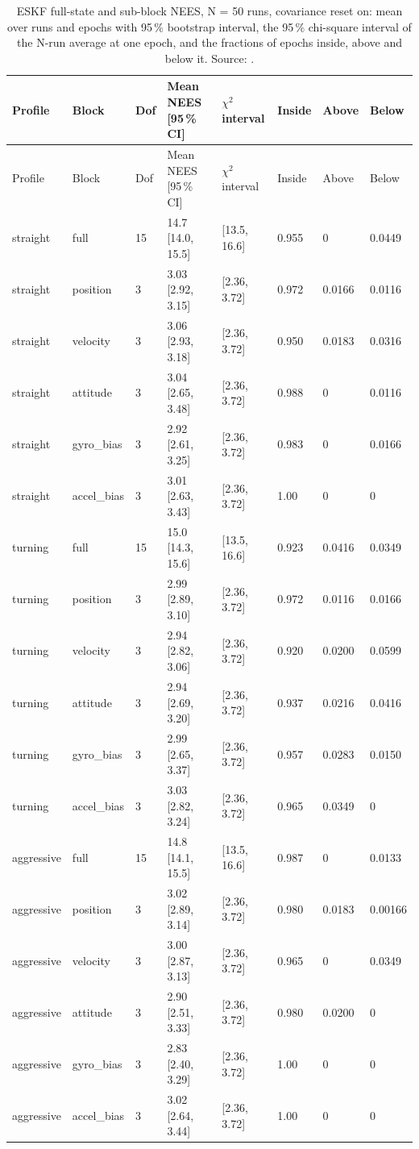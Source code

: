 {\small
\begin{longtable}{llllllll}
\caption{ESKF full-state and sub-block NEES, N = 50 runs, covariance reset on: mean over runs and epochs with 95\,\% bootstrap interval, the 95\,\% chi-square interval of the N-run average at one epoch, and the fractions of epochs inside, above and below it. Source: .}\label{tab:es_consistency}\\
\toprule
Profile & Block & Dof & Mean NEES [95\,\% CI] & $\chi^2$ interval & Inside & Above & Below \\
\midrule
\endfirsthead
\toprule
Profile & Block & Dof & Mean NEES [95\,\% CI] & $\chi^2$ interval & Inside & Above & Below \\
\midrule
\endhead
straight & full & 15 & 14.7 [14.0, 15.5] & [13.5, 16.6] & 0.955 & 0 & 0.0449 \\
straight & position & 3 & 3.03 [2.92, 3.15] & [2.36, 3.72] & 0.972 & 0.0166 & 0.0116 \\
straight & velocity & 3 & 3.06 [2.93, 3.18] & [2.36, 3.72] & 0.950 & 0.0183 & 0.0316 \\
straight & attitude & 3 & 3.04 [2.65, 3.48] & [2.36, 3.72] & 0.988 & 0 & 0.0116 \\
straight & gyro\_bias & 3 & 2.92 [2.61, 3.25] & [2.36, 3.72] & 0.983 & 0 & 0.0166 \\
straight & accel\_bias & 3 & 3.01 [2.63, 3.43] & [2.36, 3.72] & 1.00 & 0 & 0 \\
turning & full & 15 & 15.0 [14.3, 15.6] & [13.5, 16.6] & 0.923 & 0.0416 & 0.0349 \\
turning & position & 3 & 2.99 [2.89, 3.10] & [2.36, 3.72] & 0.972 & 0.0116 & 0.0166 \\
turning & velocity & 3 & 2.94 [2.82, 3.06] & [2.36, 3.72] & 0.920 & 0.0200 & 0.0599 \\
turning & attitude & 3 & 2.94 [2.69, 3.20] & [2.36, 3.72] & 0.937 & 0.0216 & 0.0416 \\
turning & gyro\_bias & 3 & 2.99 [2.65, 3.37] & [2.36, 3.72] & 0.957 & 0.0283 & 0.0150 \\
turning & accel\_bias & 3 & 3.03 [2.82, 3.24] & [2.36, 3.72] & 0.965 & 0.0349 & 0 \\
aggressive & full & 15 & 14.8 [14.1, 15.5] & [13.5, 16.6] & 0.987 & 0 & 0.0133 \\
aggressive & position & 3 & 3.02 [2.89, 3.14] & [2.36, 3.72] & 0.980 & 0.0183 & 0.00166 \\
aggressive & velocity & 3 & 3.00 [2.87, 3.13] & [2.36, 3.72] & 0.965 & 0 & 0.0349 \\
aggressive & attitude & 3 & 2.90 [2.51, 3.33] & [2.36, 3.72] & 0.980 & 0.0200 & 0 \\
aggressive & gyro\_bias & 3 & 2.83 [2.40, 3.29] & [2.36, 3.72] & 1.00 & 0 & 0 \\
aggressive & accel\_bias & 3 & 3.02 [2.64, 3.44] & [2.36, 3.72] & 1.00 & 0 & 0 \\
\bottomrule
\end{longtable}
}

